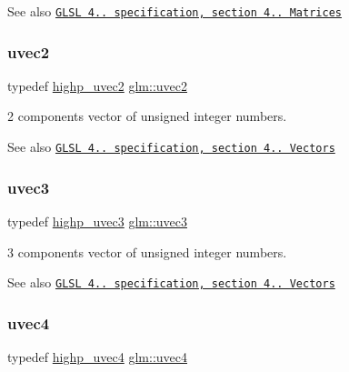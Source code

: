 \begin{DoxySeeAlso}{See also}
\href{http://www.opengl.org/registry/doc/GLSLangSpec.4.20.8.pdf}{\tt G\+L\+SL 4.. specification, section 4.. Matrices} 
\end{DoxySeeAlso}
\mbox{\label{group__core__types_gafd2041b45eff671aa8899d2c2835eee9}} 
\subsubsection{\texorpdfstring{uvec2}{uvec2}}
{\footnotesize\ttfamily typedef \mbox{\hyperlink{group__core__precision_ga34aca1cdf2130b1179fd7c5554bc1883}{highp\+\_\+uvec2}} \mbox{\hyperlink{group__core__types_gafd2041b45eff671aa8899d2c2835eee9}{glm\+::uvec2}}}

2 components vector of unsigned integer numbers.

\begin{DoxySeeAlso}{See also}
\href{http://www.opengl.org/registry/doc/GLSLangSpec.4.20.8.pdf}{\tt G\+L\+SL 4.. specification, section 4.. Vectors} 
\end{DoxySeeAlso}
\mbox{\label{group__core__types_gac4ba593917841b859ba1683b8b52b8fa}} 
\subsubsection{\texorpdfstring{uvec3}{uvec3}}
{\footnotesize\ttfamily typedef \mbox{\hyperlink{group__core__precision_ga2e16953ad75ce0c6d7faa921ca006ce5}{highp\+\_\+uvec3}} \mbox{\hyperlink{group__core__types_gac4ba593917841b859ba1683b8b52b8fa}{glm\+::uvec3}}}

3 components vector of unsigned integer numbers.

\begin{DoxySeeAlso}{See also}
\href{http://www.opengl.org/registry/doc/GLSLangSpec.4.20.8.pdf}{\tt G\+L\+SL 4.. specification, section 4.. Vectors} 
\end{DoxySeeAlso}
\mbox{\label{group__core__types_ga1c426d19627b32b14f0089f7f4ba7b1d}} 
\subsubsection{\texorpdfstring{uvec4}{uvec4}}
{\footnotesize\ttfamily typedef \mbox{\hyperlink{group__core__precision_gae48d6e9a99afc33e6fa51e5d576dfd1a}{highp\+\_\+uvec4}} \mbox{\hyperlink{group__core__types_ga1c426d19627b32b14f0089f7f4ba7b1d}{glm\+::uvec4}}}


